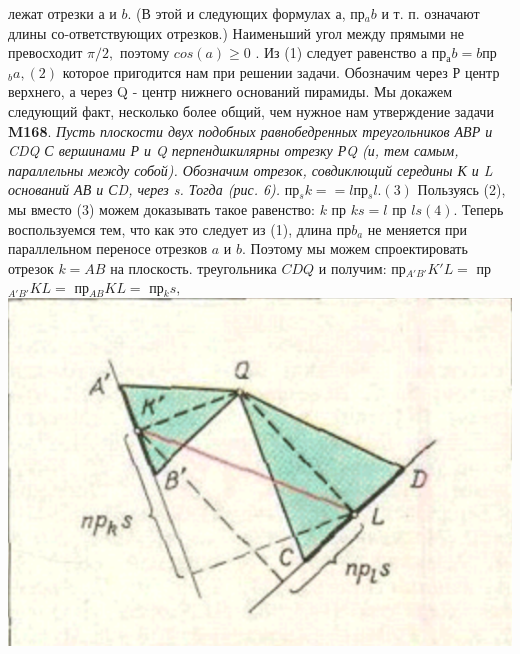 \documentclass[8pt]{article}
\begin{document}
\begin{multicols}{2}
\hspace{-7.5mm} лежат отрезки а и $b$. (В этой и следующих формулах а,  пр$_{a}b $ и т. п. означают длины со-ответствующих отрезков.) Наименьший угол между прямыми не превосходит $ \pi/2,$ поэтому $ cos(a) \ge 0 $ . Из (1) следует равенство 
\newline 
\hspace*{20.0mm} $а$ пр$_{а}b = b$пр$_{b}a,           (2)  $
\newline которое пригодится нам при решении задачи.
\newline
\hspace*{8mm} Обозначим через Р центр верхнего, а через Q - центр нижнего оснований пирамиды. Мы докажем следующий факт, несколько более общий, чем нужное нам утверждение задачи \textbf{M168}.
\newline
\hspace*{8mm} \textit{Пусть плоскости двух подобных равнобедренных треугольников АВР и CDQ С вершинами Р и Q перпендшкилярны отрезку РQ (и, тем самым, параллельны между собой). Обозначим отрезок, совдиклющий середины К и L оснований АВ и СD, через s. Тогда (рис. 6).}
\newline
\hspace*{20.0mm}  пр$_{s}k == l$пр$_{s}l.(3) $
\newline Пользуясь (2), мы вместо (3) можем доказывать такое равенство:
\newline
\hspace*{20.0mm} $ k $ пр ${k}s = l $ пр ${l}s (4). $
\newline Теперь воспользуемся тем, что как это следует из (1), длина пр$b_{a}$ не меняется при параллельном переносе отрезков $a$ и $b$. Поэтому мы можем спроектировать отрезок $k = AB$ на плоскость. треугольника $CDQ$ и получим:
\newline пр$_{A' B'}K'L =$ пр$_{A' B'}KL =$ пр$_{A B}KL =$ пр$_{k}s,$
\hspace*{6mm}\includegraphics[scale=0.96]{рисунок7.png}

\end{multicols}
\end{document}
